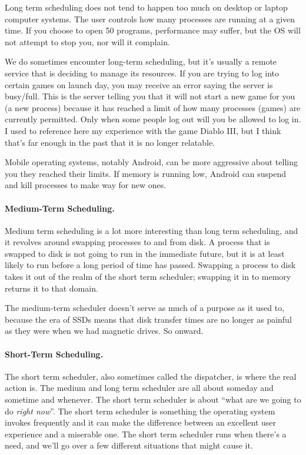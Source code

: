 Long term scheduling does not tend to happen too much on desktop or laptop computer systems. The user controls how many processes are running at a given time. If you choose to open 50 programs, performance may suffer, but the OS will not attempt to stop you, nor will it complain.

We do sometimes encounter long-term scheduling, but it's usually a remote service that is deciding to manage its resources. If you are trying to log into certain games on launch day, you may receive an error saying the server is busy/full. This is the server telling you that it will not start a new game for you (a new process) because it has reached a limit of how many processes (games) are currently permitted. Only when some people log out will you be allowed to log in. I used to reference here my experience with the game Diablo III, but I think that's far enough in the past that it is no longer relatable. 

Mobile operating systems, notably Android, can be more aggressive about telling you they reached their limits. If memory is running low, Android can suspend and kill processes to make way for new ones.

\paragraph{Medium-Term Scheduling.}
Medium term scheduling is a lot more interesting than long term scheduling, and it revolves around swapping processes to and from disk. A process that is swapped to disk is not going to run in the immediate future, but it is at least likely to run before a long period of time has passed. Swapping a process to disk takes it out of the realm of the short term scheduler; swapping it in to memory returns it to that domain.

The medium-term scheduler doesn't serve as much of a purpose as it used to, because the era of SSDs means that disk transfer times are no longer as painful as they were when we had magnetic drives. So onward.

\paragraph{Short-Term Scheduling.}
The short term scheduler, also sometimes called the dispatcher, is where the real action is. The medium and long term scheduler are all about someday and sometime and whenever. The short term scheduler is about ``what are we going to do \textit{right now}''. The short term scheduler is something the operating system invokes frequently and it can make the difference between an excellent user experience and a miserable one. The short term scheduler runs when there's a need, and we'll go over a few different situations that might cause it.

